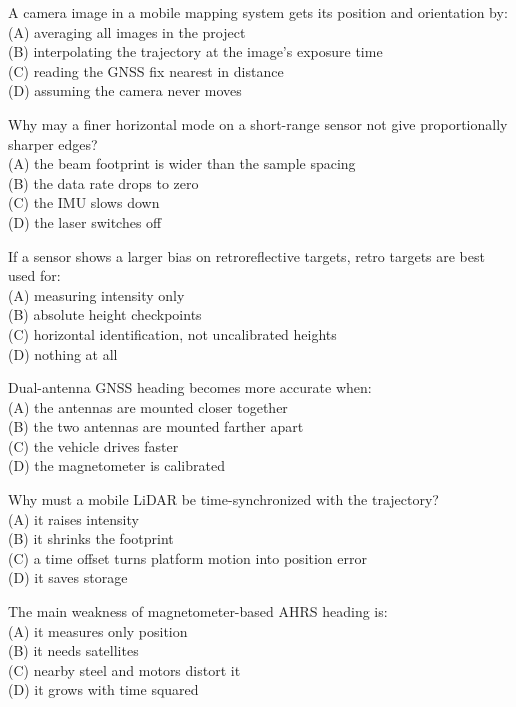 \item A camera image in a mobile mapping system gets its position and orientation by:\\[1pt] (A) averaging all images in the project\\ (B) interpolating the trajectory at the image's exposure time\\ (C) reading the GNSS fix nearest in distance\\ (D) assuming the camera never moves
\item Why may a finer horizontal mode on a short-range sensor not give proportionally sharper edges?\\[1pt] (A) the beam footprint is wider than the sample spacing\\ (B) the data rate drops to zero\\ (C) the IMU slows down\\ (D) the laser switches off
\item If a sensor shows a larger bias on retroreflective targets, retro targets are best used for:\\[1pt] (A) measuring intensity only\\ (B) absolute height checkpoints\\ (C) horizontal identification, not uncalibrated heights\\ (D) nothing at all
\item Dual-antenna GNSS heading becomes more accurate when:\\[1pt] (A) the antennas are mounted closer together\\ (B) the two antennas are mounted farther apart\\ (C) the vehicle drives faster\\ (D) the magnetometer is calibrated
\item Why must a mobile LiDAR be time-synchronized with the trajectory?\\[1pt] (A) it raises intensity\\ (B) it shrinks the footprint\\ (C) a time offset turns platform motion into position error\\ (D) it saves storage
\item The main weakness of magnetometer-based AHRS heading is:\\[1pt] (A) it measures only position\\ (B) it needs satellites\\ (C) nearby steel and motors distort it\\ (D) it grows with time squared
